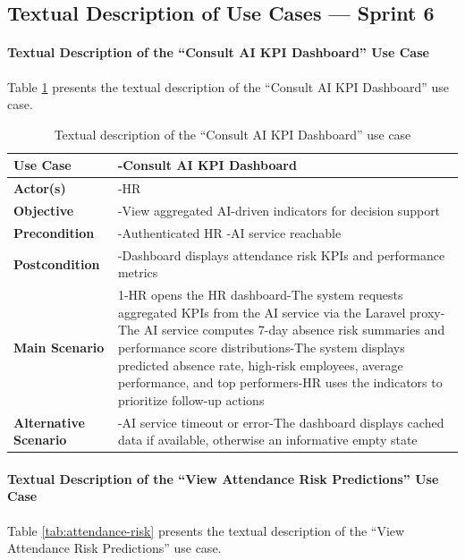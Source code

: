 \subsection{Textual Description of Use Cases — Sprint 6}

\paragraph{Textual Description of the ``Consult AI KPI Dashboard'' Use Case}
Table \ref{tab:ai-dashboard} presents the textual description of the ``Consult AI KPI Dashboard'' use case.

\begin{table}[H]
\centering
\caption{Textual description of the ``Consult AI KPI Dashboard'' use case}
\label{tab:ai-dashboard}
\begin{tabular}{|p{}|p{}|}
    \hline
   \textbf{Use Case} & -Consult AI KPI Dashboard \\
    \hline
    \textbf{Actor(s)} & -HR \\
    \hline
    \textbf{Objective} & -View aggregated AI-driven indicators for decision support \\
    \hline
    \textbf{Precondition} & -Authenticated HR\newline
-AI service reachable \\
    \hline
    \textbf{Postcondition} & -Dashboard displays attendance risk KPIs and performance metrics \\
    \hline
    \textbf{Main Scenario}
    & 1-HR opens the HR dashboard\newline
2-The system requests aggregated KPIs from the AI service via the Laravel proxy\newline
3-The AI service computes 7-day absence risk summaries and performance score distributions\newline
4-The system displays predicted absence rate, high-risk employees, average performance, and top performers\newline
5-HR uses the indicators to prioritize follow-up actions \\ \hline
    \textbf{Alternative Scenario}
    & -AI service timeout or error\newline
1-The dashboard displays cached data if available, otherwise an informative empty state \\ \hline
\end{tabular}
\end{table}

\paragraph{Textual Description of the ``View Attendance Risk Predictions'' Use Case}
Table \ref{tab:attendance-risk} presents the textual description of the ``View Attendance Risk Predictions'' use case.

